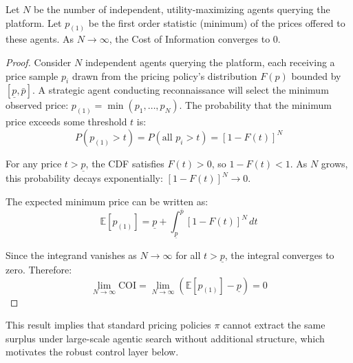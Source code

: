 \begin{theorem}
Let $N$ be the number of independent, utility-maximizing agents querying the platform. Let $p_{(1)}$ be the first order statistic (minimum) of the prices offered to these agents. As $N \to \infty$, the Cost of Information converges to 0.
\end{theorem}





\begin{proof}
Consider $N$ independent agents querying the platform, each receiving a price sample $p_i$ drawn from the pricing policy's distribution $F(p)$ bounded by $[\underline{p}, \bar{p}]$. A strategic agent conducting reconnaissance will select the minimum observed price: $p_{(1)} = \min(p_1, \ldots, p_N)$.
The probability that the minimum price exceeds some threshold $t$ is:
\begin{equation}
P(p_{(1)} > t) = P(\text{all } p_i > t) = [1 - F(t)]^N
\end{equation}

For any price $t > \underline{p}$, the CDF satisfies $F(t) > 0$, so $1 - F(t) < 1$. As $N$ grows, this probability decays exponentially: $[1 - F(t)]^N \to 0$.

The expected minimum price can be written as:
\begin{equation}
\mathbb{E}[p_{(1)}] = \underline{p} + \int_{\underline{p}}^{\bar{p}} [1 - F(t)]^N \, dt
\end{equation}

Since the integrand vanishes as $N \to \infty$ for all $t > \underline{p}$, the integral converges to zero. Therefore:
\begin{equation}
\lim_{N \to \infty} \text{COI} = \lim_{N \to \infty} (\mathbb{E}[p_{(1)}] - \underline{p}) = 0
\end{equation}
\end{proof}


This result implies that standard pricing policies $\pi$ cannot extract the same surplus under large-scale agentic search without additional structure, which motivates the robust control layer below.




